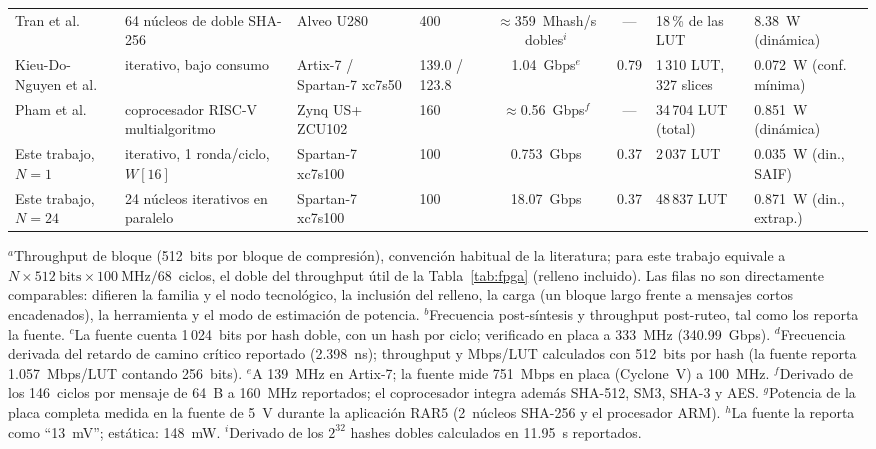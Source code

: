 \begin{table}[!t]
{\begin{tabular}{llllccll}
    Tran et al.~\cite{tran2021bca} & 64 núcleos de doble SHA-256 & Alveo U280 & 400 & $\approx$359~Mhash/s dobles$^{i}$ & --- & 18\,\% de las LUT & 8.38~W (dinámica) \\
    Kieu-Do-Nguyen et al.~\cite{r4} & iterativo, bajo consumo & Artix-7 / Spartan-7 xc7s50 & 139.0 / 123.8 & 1.04~Gbps$^{e}$ & 0.79 & 1\,310 LUT, 327 slices & 0.072~W (conf. mínima) \\
    Pham et al.~\cite{pham2026cryptorv} & coprocesador RISC-V multialgoritmo & Zynq US+ ZCU102 & 160 & $\approx$0.56~Gbps$^{f}$ & --- & 34\,704 LUT (total) & 0.851~W (dinámica) \\
    \midrule
    Este trabajo, $N=1$ & iterativo, 1 ronda/ciclo, $W[16]$ & Spartan-7 xc7s100 & 100 & 0.753~Gbps & 0.37 & 2\,037 LUT & 0.035~W (din., SAIF) \\
    Este trabajo, $N=24$ & 24 núcleos iterativos en paralelo & Spartan-7 xc7s100 & 100 & 18.07~Gbps & 0.37 & 48\,837 LUT & 0.871~W (din., extrap.) \\
    \bottomrule
  \end{tabular}%
  }
  \par\vspace{3pt}
  \begin{minipage}{\textwidth}\footnotesize\raggedright
  $^a$Throughput de bloque (512~bits por bloque de compresión), convención habitual de la literatura; para este trabajo equivale a $N \times 512~\text{bits} \times 100~\text{MHz}/68$~ciclos, el doble del throughput útil de la Tabla~\ref{tab:fpga} (relleno incluido). Las filas no son directamente comparables: difieren la familia y el nodo tecnológico, la inclusión del relleno, la carga (un bloque largo frente a mensajes cortos encadenados), la herramienta y el modo de estimación de potencia. $^{b}$Frecuencia post-síntesis y throughput post-ruteo, tal como los reporta la fuente. $^{c}$La fuente cuenta 1\,024~bits por hash doble, con un hash por ciclo; verificado en placa a 333~MHz (340.99~Gbps). $^{d}$Frecuencia derivada del retardo de camino crítico reportado (2.398~ns); throughput y Mbps/LUT calculados con 512~bits por hash (la fuente reporta 1.057~Mbps/LUT contando 256~bits). $^{e}$A 139~MHz en Artix-7; la fuente mide 751~Mbps en placa (Cyclone~V) a 100~MHz. $^{f}$Derivado de los 146~ciclos por mensaje de 64~B a 160~MHz reportados; el coprocesador integra además SHA-512, SM3, SHA-3 y AES. $^{g}$Potencia de la placa completa medida en la fuente de 5~V durante la aplicación RAR5 (2~núcleos SHA-256 y el procesador ARM). $^{h}$La fuente la reporta como ``13~mV''; estática: 148~mW. $^{i}$Derivado de los $2^{32}$ hashes dobles calculados en 11.95~s reportados.
  \end{minipage}
\end{table}
